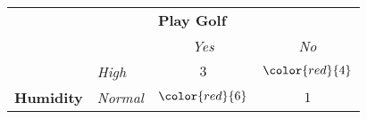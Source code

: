 	\begin{table}[H]
		\centering
		\begin{tabular}{|l|l|c|c|}
		\hline
		\multicolumn{2}{|l|}{} & \multicolumn{2}{l|}{\cellcolor[HTML]{FFCCC9}\textbf{Play Golf}} \\ \cline{3-4} 
		\multicolumn{2}{|l|}{\multirow{-2}{*}{}} & \cellcolor[HTML]{FFCCC9}\textit{Yes} & \cellcolor[HTML]{FFCCC9}\textit{No} \\ \hline
		\cellcolor[HTML]{ECF4FF} & \cellcolor[HTML]{ECF4FF}\textit{High} & $3$ & $\color{red}{4}$ \\ \cline{2-4} 
		\multirow{-2}{*}{\cellcolor[HTML]{ECF4FF}\textbf{\phantom{x}Humidity\phantom{xx}}} & \cellcolor[HTML]{ECF4FF}\textit{Normal\phantom{xx}} & $\color{red}{6}$ & $1$ \\ \hline
		\end{tabular}
	\end{table}
	
